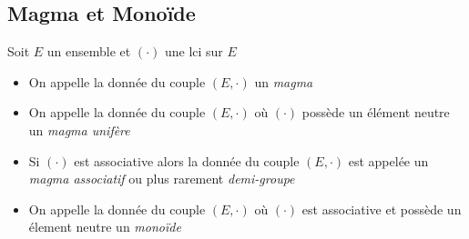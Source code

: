 \documentclass[11pt,colorlinks]{book}
\theoremstyle{mytheoremstyle}
\theoremstyle{mytheoremstyle}
\theoremstyle{mytheoremstyle}
\theoremstyle{mytheoremstyle}
\theoremstyle{mytheoremstyle}
\theoremstyle{mytheoremstyle}
\theoremstyle{mytheoremstyle}
\theoremstyle{mytheoremstyle}
\theoremstyle{myproblemstyle}
\begin{document}
\subsection{Magma et Monoïde}
\begin{rmq}
  Soit $E$ un ensemble et $(\cdot)$ une lci sur $E$ 
  \begin{itemize}
    \item On appelle la donnée du couple $(E,\cdot)$ un \textit{magma}
    \item On appelle la donnée du couple $(E,\cdot)$ où $(\cdot)$ possède un élément neutre un \textit{magma unifère}
    \item Si $(\cdot)$ est associative alors la donnée du couple $(E,\cdot)$ est appelée un \textit{magma associatif} ou plus rarement \textit{demi-groupe}
    \item On appelle la donnée du couple $(E,\cdot)$ où $(\cdot)$ est associative et possède un élement neutre un \textit{monoïde}
  \end{itemize}
\end{rmq}
\end{document}
